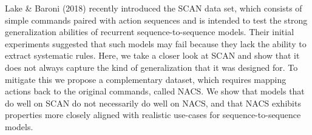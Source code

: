 Lake \& Baroni (2018) recently introduced the SCAN data set, which consists of simple commands paired with action sequences and is intended to test the strong generalization abilities of recurrent sequence-to-sequence models. Their initial experiments suggested that such models may fail because they lack the ability to extract systematic rules. Here, we take a closer look at SCAN and show that it does not always capture the kind of generalization that it was designed for. To mitigate this we propose a complementary dataset, which requires mapping actions back to the original commands, called NACS. We show that models that do well on SCAN do not necessarily do well on NACS, and that NACS exhibits properties more closely aligned with realistic use-cases for sequence-to-sequence models.
